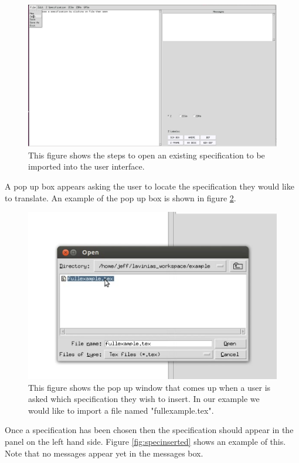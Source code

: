 \begin{figure}[H]
\includegraphics[scale=0.35]{Figures/Interface/openspec.png}
\caption{This figure shows the steps to open an existing specification to be imported into the user interface. \label{fig:openspec}}
\end{figure}

A pop up box appears asking the user to locate the specification they would like
to translate. An example of the pop up box is shown in figure
\ref{fig:choosespec}. 

\begin{figure}[H]
\includegraphics[scale=0.8]{Figures/Interface/choosespec.png}
\caption{This figure shows the pop  up  window that comes up when a user is asked which specification they wish to insert. In our example we would like to import a file named "fullexample.tex". \label{fig:choosespec}}
\end{figure}

Once a specification has been chosen then the specification should appear in the
panel on the left hand side. Figure \ref{fig:specinserted} shows an example of
this. Note that no messages appear yet in the messages box.

